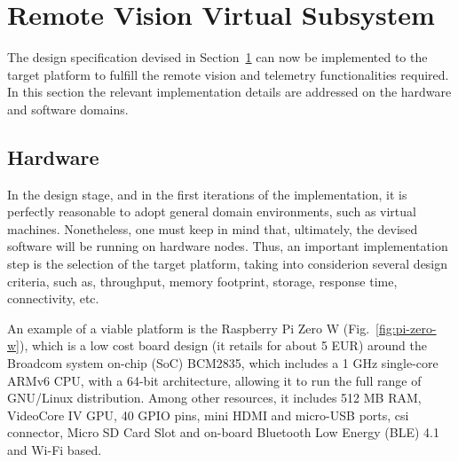 \section{Remote Vision Virtual Subsystem}%
\label{sec:remote-visi-subsyst-design}
The design specification devised in
Section~\ref{sec:remote-visi-subsyst-design} can now be implemented to the
target platform to fulfill the remote vision and telemetry functionalities
required. In this section the relevant implementation details are
addressed on the hardware and software domains.
%
\subsection{Hardware}%
\label{sec:hardware-rvvs-implem}
In the design stage, and in the first iterations of the
implementation, it is perfectly reasonable to adopt general domain environments,
such as virtual machines. Nonetheless, one must keep in mind that, ultimately,
the devised software will be running on hardware nodes. Thus, an important implementation step is the selection of the target
platform, taking into considerion several design criteria, such as, throughput,
memory footprint, storage, response time, connectivity, etc.

An example of a viable platform is the Raspberry Pi Zero W (Fig.~\ref{fig:pi-zero-w}), which is a low cost
board design (it retails for about 5 EUR) around the Broadcom system on-chip (SoC) BCM2835, which includes a
1 GHz single-core ARMv6 CPU, with a 64-bit architecture, allowing it to run
the full range of GNU/Linux distribution. Among other resources, it includes 512
MB RAM, VideoCore IV GPU, 40 GPIO pins, mini HDMI and micro-USB ports,
\gls{csi} connector, Micro SD Card Slot and on-board Bluetooth Low Energy (BLE)
4.1 and Wi-Fi based.

